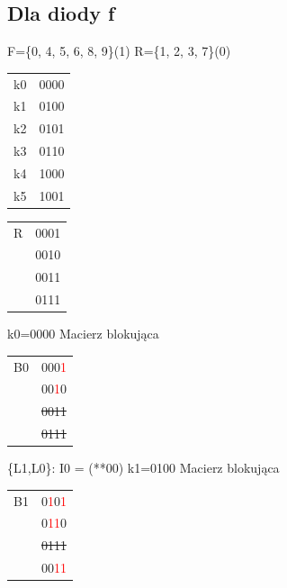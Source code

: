 \documentclass[]{article}
\begin{document}
\subsection{Dla diody f}
F=\{0, 4, 5, 6, 8, 9\}(1)   R=\{1, 2, 3, 7\}(0)
\newline
\newline
\begin{minipage}{0.5\textwidth}
\centering
\begin{tabular}{|c|c|}
\hline
k0 & 0000 \\
k1 & 0100 \\
k2 & 0101 \\
k3 & 0110 \\
k4 & 1000 \\
k5 & 1001 \\
\hline
\end{tabular}
\end{minipage}
\hfill
\begin{minipage}{0.5\textwidth}
\centering
\begin{tabular}[r]{|c|c|}
\hline
    R & 0001 \\
      & 0010 \\
      & 0011 \\
      & 0111 \\
\hline 
\end{tabular}
\end{minipage}
\newline
\newline
\newline
k0=0000
\newline
Macierz blokująca
\newline
\begin{tabular}[r]{|c|c|}
\hline
    B0 & 000\textcolor{red}{1} \\
      & 00\textcolor{red}{1}0 \\
      & \sout{0011} \\
      & \sout{0111} \\
 \hline 
\end{tabular}
\newline
\newline
\{L1,L0\}: I0 = (**00)
\newline
\newline
k1=0100
\newline
Macierz blokująca
\newline
\begin{tabular}[r]{|c|c|}
\hline
    B1 & 0\textcolor{red}{1}0\textcolor{red}{1} \\
      & 0\textcolor{red}{1}\textcolor{red}{1}0 \\
      & \sout{0111} \\
      & 00\textcolor{red}{1}\textcolor{red}{1} \\
 \hline 
\end{tabular}
\end{document}
